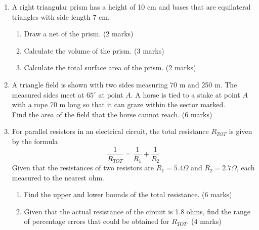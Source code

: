\documentclass[12pt, twoside]{article}
\begin{document}
\begin{enumerate}
\item A right triangular prism has a height of 10 cm and bases that are equilateral triangles with side length 7 cm.
\begin{enumerate}
  \item Draw a net of the prism. \hfill (2 marks)
  \item Calculate the volume of the prism. \hfill (3 marks)
  \item Calculate the total surface area of the prism. \hfill (2 marks)
\end{enumerate}

\newpage
\item A triangle field is shown with two sides measuring 70 m and 250 m. The measured sides meet at $65^\circ$ at point $A$. A horse is tied to a stake at point $A$ with a rope 70 m long so that it can graze within the sector marked. \\[0.25cm]
Find the area of the field that the horse cannot reach. \hfill (6 marks)
  \begin{center}
    \end{center}

\item For parallel resistors in an electrical circuit, the total resistance $R_{TOT}$ is given by the formula 
$$ \frac{1}{R_{TOT}} = \frac{1}{R_1} + \frac{1}{R_2}$$
Given that the resistances of two resistors are $R_1 = 5.4 \Omega$ and $R_2 = 2.7 \Omega$, each measured to the nearest ohm.
\begin{enumerate}
  \item Find the upper and lower bounds of the total resistance. \hfill (6 marks)
  \item Given that the actual resistance of the circuit is 1.8 ohms, find the range of percentage errors that could be obtained for $R_{TOT}$. \hfill (4 marks)
\end{enumerate}


\end{enumerate}
\end{document}
